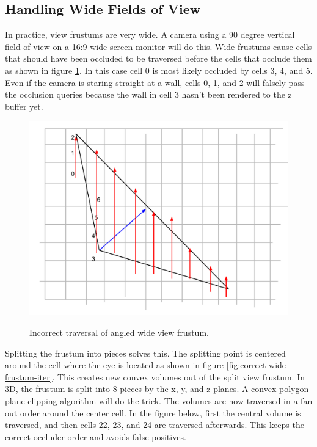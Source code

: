 \documentclass[12pt]{ucthesis}
\newcommand{\captionfonts}{\small\bf\ssp}
\begin{document}
\subsection{Handling Wide Fields of View}
\label{handling-wide-fields-of-view}
In practice, view frustums are very wide.
A camera using a 90 degree vertical field of view on a 16:9 wide screen monitor will do this.
Wide frustums cause cells that should have been occluded to be traversed before the cells that occlude them as shown in figure \ref{fig:wide-frustum-iter}.
In this case cell 0 is most likely occluded by cells 3, 4, and 5.
Even if the camera is staring straight at a wall, cells 0, 1, and 2 will falsely pass the occlusion queries because the wall in cell 3 hasn't been rendered to the z buffer yet.

\begin{figure}
\begin{center}
\includegraphics[width=\textwidth]{Images/wide-frustum.pdf}
\captionfonts
\caption[Incorrect Wide View Frustum Traversal]{Incorrect traversal of angled wide view frustum.}
\label{fig:wide-frustum-iter}
\end{center}
\end{figure}

Splitting the frustum into pieces solves this.
The splitting point is centered around the cell where the eye is located as shown in figure \ref{fig:correct-wide-frustum-iter}.
This creates new convex volumes out of the split view frustum.
In 3D, the frustum is split into 8 pieces by the x, y, and z planes.
A convex polygon plane clipping algorithm will do the trick.
The volumes are now traversed in a fan out order around the center cell.
In the figure below, first the central volume is traversed, and then cells 22, 23, and 24 are traversed afterwards.
This keeps the correct occluder order and avoids false positives.
\end{document}
